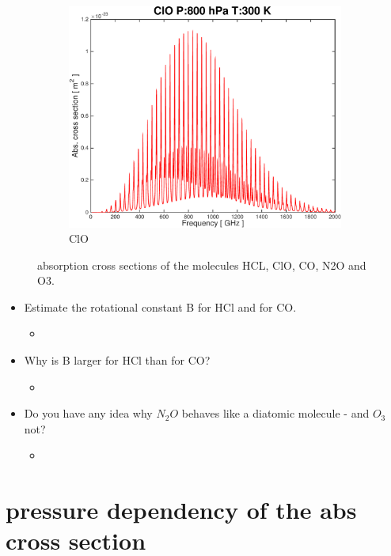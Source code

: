 \documentclass[paper=a4, fontsize=11pt]{scrartcl} %
\numberwithin{figure}{section}
\begin{document}
\begin{figure}[t!]
 \begin{subfigure}[b]{0.45\textwidth} 
 \includegraphics[width=\textwidth]{plots/plot_xsec_ClO_800hPa_300K.pdf}
 \caption{ClO}
 \end{subfigure}
 
 \caption{absorption cross sections of the molecules HCL, ClO, CO, N2O and O3.}
 \label{figure:abs_molucules}
\end{figure}

\begin{itemize}
	\item Estimate the rotational constant B for HCl and for CO. 
		\begin{itemize}
		\item 
		\end{itemize}
	\item Why is B larger for HCl than for CO?
		\begin{itemize}
		\item 
		\end{itemize}
	\item Do you have any idea why $N_{2}O$ behaves like a diatomic molecule - and $O_{3}$ not?
		\begin{itemize}
		\item 
		\end{itemize}
\end{itemize}


\section{pressure dependency of the abs cross section}
\end{document}

